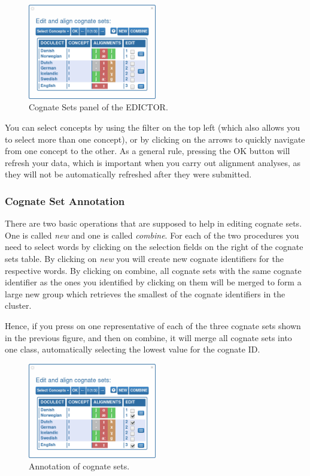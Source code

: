 \documentclass[a4paper,svgnames]{scrartcl}
\begin{document}
\begin{figure}
\centering
\includegraphics[width=0.5\textwidth]{images/figure-8.png}
\caption{Cognate Sets panel of the EDICTOR.}
\end{figure}

You can select concepts by using the filter on the top left (which also
allows you to select more than one concept), or by clicking on the
arrows to quickly navigate from one concept to the other. As a general
rule, pressing the OK button will refresh your data, which is important
when you carry out alignment analyses, as they will not be automatically
refreshed after they were submitted.

\subsubsection*{Cognate Set Annotation}\label{cognate-set-annotation}

There are two basic operations that are supposed to help in editing
cognate sets. One is called \emph{new} and one is called \emph{combine}.
For each of the two procedures you need to select words by clicking on
the selection fields on the right of the cognate sets table. By clicking
on \emph{new} you will create new cognate identifiers for the respective
words. By clicking on combine, all cognate sets with the same cognate
identifier as the ones you identified by clicking on them will be merged
to form a large new group which retrieves the smallest of the cognate
identifiers in the cluster.

Hence, if you press on one representative of each of the three cognate
sets shown in the previous figure, and then on combine, it will merge
all cognate sets into one class, automatically selecting the lowest
value for the cognate ID.

\begin{figure}
\centering
\includegraphics[width=0.5\textwidth]{images/figure-9.png}
\caption{Annotation of cognate sets.}
\end{figure}
\end{document}
